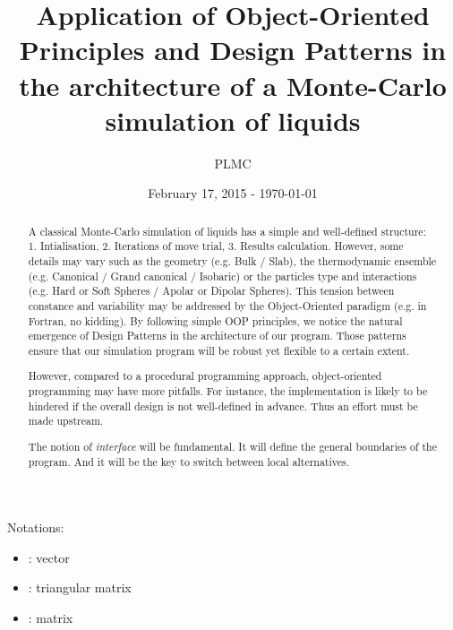 \documentclass[a4paper, 12pt]{article}
\title{Application of Object-Oriented Principles and Design Patterns in the architecture of
    a Monte-Carlo simulation of liquids}
\author{PLMC}
\date{February 17, 2015 - \today{}}
\begin{document}
    \maketitle

    \begin{abstract}
        A classical Monte-Carlo simulation of liquids has a simple and well-defined structure:
        1. Intialisation, 2. Iterations of move trial, 3. Results calculation.
        However, some details may vary such as the geometry (e.g. Bulk / Slab),
        the thermodynamic ensemble (e.g. Canonical / Grand canonical / Isobaric)
        or the particles type and interactions (e.g. Hard or Soft Spheres /
        Apolar or Dipolar Spheres).
        This tension between constance and variability may be addressed by
        the Object-Oriented paradigm (e.g. in Fortran, no kidding).
        By following simple OOP principles, we notice the natural emergence of Design Patterns
        in the architecture of our program.
        Those patterns ensure that our simulation program will be robust yet flexible
        to a certain extent.

        However, compared to a procedural programming approach, object-oriented programming
        may have more pitfalls.
        For instance, the implementation is likely to be hindered if the overall design is
        not well-defined in advance. Thus an effort must be made upstream.

        The notion of \emph{interface} will be fundamental. It will define the general boundaries of
        the program. And it will be the key to switch between local alternatives.
    \end{abstract}

    Notations:
    \begin{itemize}
        \item {}: vector
        \item {}: triangular matrix
        \item {}: matrix
    \end{itemize}

    \newpage
    \tableofcontents
\end{document}
